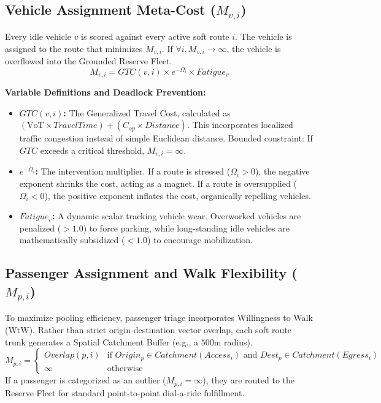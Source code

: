 \documentclass[12pt,a4paper]{article}
\begin{document}
\subsection[Vehicle Assignment Meta-Cost (M v,i)]{Vehicle Assignment Meta-Cost ($M_{v, i}$)}
Every idle vehicle $v$ is scored against every active soft route $i$. The vehicle is assigned to the route that minimizes $M_{v, i}$. If $\forall i, M_{v, i} \to \infty$, the vehicle is overflowed into the Grounded Reserve Fleet.
\begin{equation}
    M_{v, i} = GTC(v, i) \times e^{-\Omega_i} \times Fatigue_v
\end{equation}

\textbf{Variable Definitions and Deadlock Prevention:}
\begin{itemize}
    \item \textbf{$GTC(v, i)$:} The Generalized Travel Cost, calculated as $(\text{VoT} \times TravelTime) + (C_{op} \times Distance)$. This incorporates localized traffic congestion instead of simple Euclidean distance. Bounded constraint: If $GTC$ exceeds a critical threshold, $M_{v, i} = \infty$.
    \item \textbf{$e^{-\Omega_i}$:} The intervention multiplier. If a route is stressed ($\Omega_i > 0$), the negative exponent shrinks the cost, acting as a magnet. If a route is oversupplied ($\Omega_i < 0$), the positive exponent inflates the cost, organically repelling vehicles.
    \item \textbf{$Fatigue_v$:} A dynamic scalar tracking vehicle wear. Overworked vehicles are penalized ($>1.0$) to force parking, while long-standing idle vehicles are mathematically subsidized ($<1.0$) to encourage mobilization.
\end{itemize}

\subsection[Passenger Assignment Meta-Cost (M p,i)]{Passenger Assignment and Walk Flexibility ($M_{p, i}$)}
To maximize pooling efficiency, passenger triage incorporates Willingness to Walk (WtW). Rather than strict origin-destination vector overlap, each soft route trunk generates a Spatial Catchment Buffer (e.g., a $500$m radius). 
\begin{equation}
    M_{p, i} = 
    \begin{cases} 
      Overlap(p, i) & \text{if } Origin_p \in Catchment(Access_i) \text{ and } Dest_p \in Catchment(Egress_i) \\
      \infty & \text{otherwise}
   \end{cases}
\end{equation}
If a passenger is categorized as an outlier ($M_{p, i} = \infty$), they are routed to the Reserve Fleet for standard point-to-point dial-a-ride fulfillment.
\end{document}
